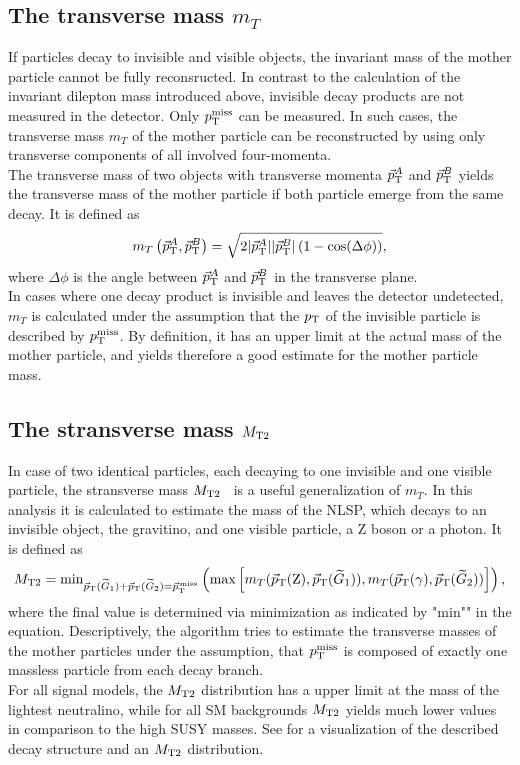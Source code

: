 \subsection*{The transverse mass $m_{T}$}
If particles decay to invisible and visible objects, the invariant mass of the mother particle cannot be fully reconsructed. In contrast to the calculation of the invariant dilepton mass introduced above, invisible decay products are not measured in the detector. Only $p_{\mathrm{T}}^\text{miss}$ can be measured. In such cases, the transverse mass $m_{T}$ of the mother particle can be reconstructed by using only transverse components of all involved four-momenta.\\
The transverse mass of two objects with transverse momenta ${\vec p}_{\mathrm{T}}^A$ and ${\vec p}_{\mathrm{T}}^B$ yields the transverse mass of the mother particle if both particle emerge from the same decay.
It is defined as
\begin{equation}
 m_T\left({\vec p}_{\mathrm{T}}^{A},{\vec p}_{\mathrm{T}}^B\right) = \sqrt{2|{\vec p}_{\mathrm{T}}^A||{\vec p}_{\mathrm{T}}^B|\left(1-\cos(\Delta\phi)\right)},
\end{equation}
where $\Delta\phi$ is the angle between ${\vec p}_{\mathrm{T}}^A$ and ${\vec p}_{\mathrm{T}}^B$ in the transverse plane.\\
In cases where one decay product is invisible and leaves the detector undetected, $m_T$ is calculated under the assumption that the $p_{\mathrm{T}}$ of the invisible particle is described by $p_{\mathrm{T}}^\text{miss}$. By definition, it has an upper limit at the actual mass of the mother particle, and yields therefore a good estimate for the mother particle mass.

\subsection*{The stransverse mass $M_{\mathrm{T2}}$}
In case of two identical particles, each decaying to one invisible and one visible particle, the stransverse mass $M_{\mathrm{T2}}$~\cite{Mt2_1,Mt2_2} is a useful generalization of $m_T$. In this analysis it is calculated to estimate the mass of the NLSP, which decays to an invisible object, the gravitino, and one visible particle, a Z boson or a photon. It is defined as
\begin{equation}
 M_{\mathrm{T2}} = \text{min}_{{\vec p}_{\mathrm{T}}(\widetilde{G}_1)+{\vec p}_{\mathrm{T}}(\widetilde{G}_2)={\vec p}_{\mathrm{T}}^{\kern1pt\text{miss}}}\left(\text{max}\left[m_T({\vec p}_{\mathrm{T}}(\mathrm{Z}),{\vec p}_{\mathrm{T}}(\widetilde{G}_1)),m_T({\vec p}_{\mathrm{T}}(\gamma),{\vec p}_{\mathrm{T}}(\widetilde{G}_2))\right]\right),
\end{equation}
where the final value is determined via minimization as indicated by "$\text{min}$"" in the equation. Descriptively, the algorithm tries to estimate the transverse masses of the mother particles under the assumption, that $p_{\mathrm{T}}^\text{miss}$ is composed of exactly one massless particle from  each decay branch.\\
For all signal models, the $M_{\mathrm{T2}}$ distribution has a upper limit at the mass of the lightest neutralino, while for all SM backgrounds $M_{\mathrm{T2}}$ yields much lower values in comparison to the high SUSY masses. See  for a visualization of the described decay structure and an $M_{\mathrm{T2}}$ distribution.

